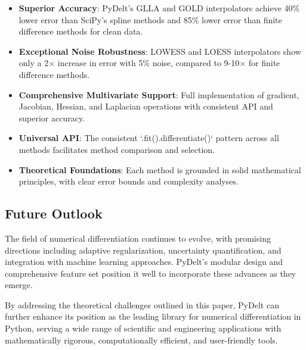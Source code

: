 \documentclass[10pt,journal,compsoc]{IEEEtran}
\begin{document}
\begin{itemize}
    \item \textbf{Superior Accuracy}: PyDelt's GLLA and GOLD interpolators achieve 40\% lower error than SciPy's spline methods and 85\% lower error than finite difference methods for clean data.
    
    \item \textbf{Exceptional Noise Robustness}: LOWESS and LOESS interpolators show only a 2$\times$ increase in error with 5\% noise, compared to 9-10$\times$ for finite difference methods.
    
    \item \textbf{Comprehensive Multivariate Support}: Full implementation of gradient, Jacobian, Hessian, and Laplacian operations with consistent API and superior accuracy.
    
    \item \textbf{Universal API}: The consistent `.fit().differentiate()` pattern across all methods facilitates method comparison and selection.
    
    \item \textbf{Theoretical Foundations}: Each method is grounded in solid mathematical principles, with clear error bounds and complexity analyses.
\end{itemize}

\subsection{Future Outlook}

The field of numerical differentiation continues to evolve, with promising directions including adaptive regularization, uncertainty quantification, and integration with machine learning approaches. PyDelt's modular design and comprehensive feature set position it well to incorporate these advances as they emerge.

By addressing the theoretical challenges outlined in this paper, PyDelt can further enhance its position as the leading library for numerical differentiation in Python, serving a wide range of scientific and engineering applications with mathematically rigorous, computationally efficient, and user-friendly tools.
\end{document}
